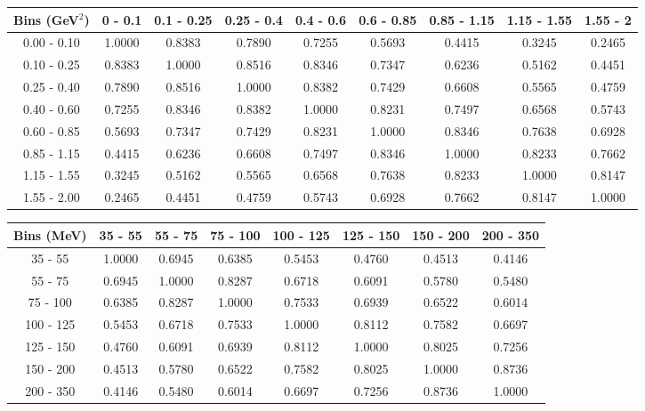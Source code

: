 \documentclass[aps, prd, reprint,showpacs,  preprintnumbers,amsmath,amssymb,superscriptaddress, nofootinbib]{revtex4-1}
\makeatletter
\renewenvironment{table}
  {\def\@captype{table}}
  {}
\makeatother
\begin{document}
\begin{table}
\centering
\begin{tabular}{ccccccccc}
\hline
Bins (GeV$^{2}$) & 0 - 0.1 & 0.1 - 0.25 & 0.25 - 0.4 & 0.4 - 0.6 & 0.6 - 0.85 & 0.85 - 1.15 & 1.15 - 1.55 & 1.55 - 2 \\ 
\hline
0.00 - 0.10 & 1.0000 & 0.8383 & 0.7890 & 0.7255 & 0.5693 & 0.4415 & 0.3245 & 0.2465 \\ 
0.10 - 0.25 & 0.8383 & 1.0000 & 0.8516 & 0.8346 & 0.7347 & 0.6236 & 0.5162 & 0.4451 \\ 
0.25 - 0.40 & 0.7890 & 0.8516 & 1.0000 & 0.8382 & 0.7429 & 0.6608 & 0.5565 & 0.4759 \\ 
0.40 - 0.60 & 0.7255 & 0.8346 & 0.8382 & 1.0000 & 0.8231 & 0.7497 & 0.6568 & 0.5743 \\ 
0.60 - 0.85 & 0.5693 & 0.7347 & 0.7429 & 0.8231 & 1.0000 & 0.8346 & 0.7638 & 0.6928 \\ 
0.85 - 1.15 & 0.4415 & 0.6236 & 0.6608 & 0.7497 & 0.8346 & 1.0000 & 0.8233 & 0.7662 \\ 
1.15 - 1.55 & 0.3245 & 0.5162 & 0.5565 & 0.6568 & 0.7638 & 0.8233 & 1.0000 & 0.8147 \\ 
1.55 - 2.00 & 0.2465 & 0.4451 & 0.4759 & 0.5743 & 0.6928 & 0.7662 & 0.8147 & 1.0000 \\ 
\hline
\hline
\end{tabular}
\caption{Correlation matrix for bins of $d\sigma/dQ^2$.}
\label{tb:pip_Q2_cov}
\end{table}

\vspace{1cm}

\begin{table}
\centering
\begin{tabular}{cccccccc}
\hline
Bins (MeV) & 35 - 55 & 55 - 75 & 75 - 100 & 100 - 125 & 125 - 150 & 150 - 200 & 200 - 350 \\ 
\hline
35 - 55 & 1.0000 & 0.6945 & 0.6385 & 0.5453 & 0.4760 & 0.4513 & 0.4146 \\ 
55 - 75 & 0.6945 & 1.0000 & 0.8287 & 0.6718 & 0.6091 & 0.5780 & 0.5480 \\ 
75 - 100 & 0.6385 & 0.8287 & 1.0000 & 0.7533 & 0.6939 & 0.6522 & 0.6014 \\ 
100 - 125 & 0.5453 & 0.6718 & 0.7533 & 1.0000 & 0.8112 & 0.7582 & 0.6697 \\ 
125 - 150 & 0.4760 & 0.6091 & 0.6939 & 0.8112 & 1.0000 & 0.8025 & 0.7256 \\ 
150 - 200 & 0.4513 & 0.5780 & 0.6522 & 0.7582 & 0.8025 & 1.0000 & 0.8736 \\ 
200 - 350 & 0.4146 & 0.5480 & 0.6014 & 0.6697 & 0.7256 & 0.8736 & 1.0000 \\ 
\hline

\hline
\end{tabular}
\caption{Correlation matrix for bins of $d\sigma/dT_\pi$.}
\label{tb:pip_kinetic_cov}
\end{table}
\end{document}

